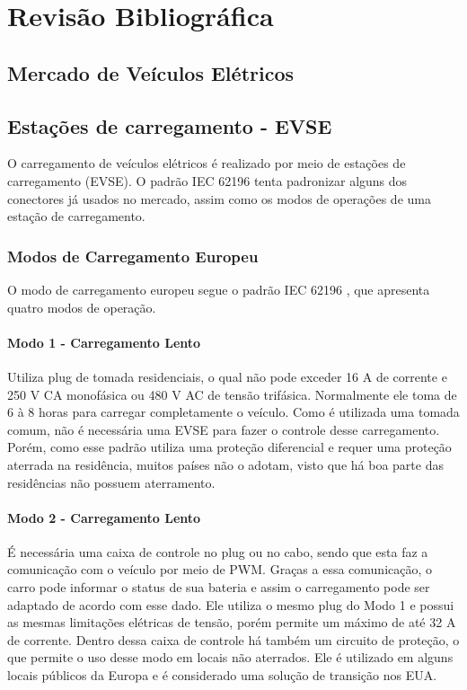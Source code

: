 \chapter{Revisão Bibliográfica}

  \section{Mercado de Veículos Elétricos}

  \section{Estações de carregamento - \ac{EVSE}}

    O carregamento de veículos elétricos é realizado por meio de estações de carregamento (\ac{EVSE}). O padrão IEC 62196 \cite{iec-62196} tenta padronizar alguns dos conectores já usados no mercado, assim como os modos de operações de uma estação de carregamento.


    \subsection{Modos de Carregamento Europeu}

      O modo de carregamento europeu segue o padrão IEC 62196 \cite{iec-62196}, que apresenta quatro modos de operação.

        \subsubsection{Modo 1 - Carregamento Lento}

        Utiliza plug de tomada residenciais, o qual não pode exceder 16 A de corrente e 250 V \ac{CA} monofásica ou 480 V AC de tensão trifásica. Normalmente ele toma de 6 à 8 horas para carregar completamente o veículo. Como é utilizada uma tomada comum, não é necessária uma \ac{EVSE} para fazer o controle desse carregamento. Porém, como esse padrão utiliza uma proteção diferencial e requer uma proteção aterrada na residência, muitos países não o adotam, visto que há boa parte das residências não possuem aterramento.

        \subsubsection{Modo 2 - Carregamento Lento}

        É necessária uma caixa de controle no plug ou no cabo, sendo que esta faz a comunicação com o veículo por meio de \ac{PWM}. Graças a essa comunicação, o carro pode informar o status de sua bateria e assim o carregamento pode ser adaptado de acordo com esse dado. Ele utiliza o mesmo plug do Modo 1 e possui as mesmas limitações elétricas de tensão, porém permite um máximo de até 32 A de corrente. Dentro dessa caixa de controle há também um circuito de proteção, o que permite o uso desse modo em locais não aterrados. Ele é utilizado em alguns locais públicos da Europa e é considerado uma solução de transição nos EUA.

